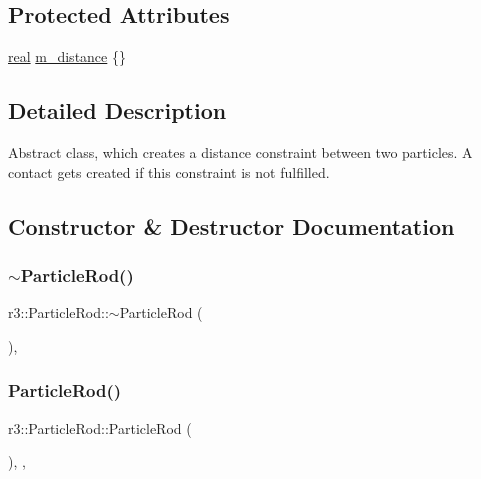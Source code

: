 \subsection*{Protected Attributes}
\begin{DoxyCompactItemize}
\item 
\mbox{\hyperlink{namespacer3_ab2016b3e3f743fb735afce242f0dc1eb}{real}} \mbox{\hyperlink{classr3_1_1_particle_rod_af5a502fa94afea7144eadd509a951f70}{m\+\_\+distance}} \{\}
\end{DoxyCompactItemize}


\subsection{Detailed Description}
Abstract class, which creates a distance constraint between two particles. A contact gets created if this constraint is not fulfilled. 

\subsection{Constructor \& Destructor Documentation}
\mbox{\label{classr3_1_1_particle_rod_aa6fd377f7694d3d64ef4135e6bd4299e}} 
\subsubsection{\texorpdfstring{$\sim$\+Particle\+Rod()}{~ParticleRod()}}
{\footnotesize\ttfamily r3\+::\+Particle\+Rod\+::$\sim$\+Particle\+Rod (\begin{DoxyParamCaption}{ }\end{DoxyParamCaption})\hspace{0.3cm}{\ttfamily [virtual]}, {\ttfamily [default]}}

\mbox{\label{classr3_1_1_particle_rod_a5ceef2a44c266092396799440c9c674f}} 
\subsubsection{\texorpdfstring{Particle\+Rod()}{ParticleRod()}}
{\footnotesize\ttfamily r3\+::\+Particle\+Rod\+::\+Particle\+Rod (\begin{DoxyParamCaption}{ }\end{DoxyParamCaption})\hspace{0.3cm}{\ttfamily [explicit]}, {\ttfamily [protected]}, {\ttfamily [default]}}



